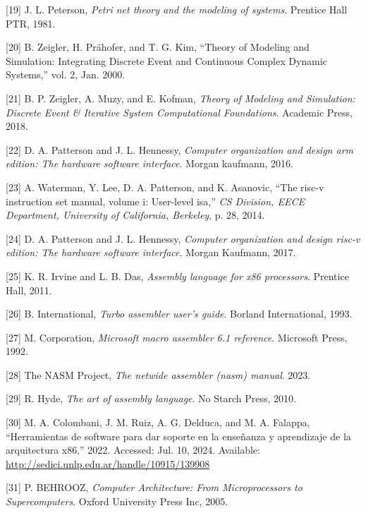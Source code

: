 \documentclass[12pt,twoside]{templates/unerthesis}
\newenvironment{cslreferences}%
  {}%
  {\par}
\begin{document}
\begin{cslreferences}
\leavevmode\hypertarget{ref-peterson_petri_1981}{}%
{[}19{]} J. L. Peterson, \emph{Petri net theory and the modeling of systems}. Prentice Hall PTR, 1981.

\leavevmode\hypertarget{ref-zeigler_theory_2000}{}%
{[}20{]} B. Zeigler, H. Prähofer, and T. G. Kim, ``Theory of Modeling and Simulation: Integrating Discrete Event and Continuous Complex Dynamic Systems,'' vol. 2, Jan. 2000.

\leavevmode\hypertarget{ref-zeigler_theory_2018}{}%
{[}21{]} B. P. Zeigler, A. Muzy, and E. Kofman, \emph{Theory of Modeling and Simulation: Discrete Event \& Iterative System Computational Foundations}. Academic Press, 2018.

\leavevmode\hypertarget{ref-patterson2016computer}{}%
{[}22{]} D. A. Patterson and J. L. Hennessy, \emph{Computer organization and design arm edition: The hardware software interface}. Morgan kaufmann, 2016.

\leavevmode\hypertarget{ref-waterman2014risc}{}%
{[}23{]} A. Waterman, Y. Lee, D. A. Patterson, and K. Asanovic, ``The risc-v instruction set manual, volume i: User-level isa,'' \emph{CS Division, EECE Department, University of California, Berkeley}, p. 28, 2014.

\leavevmode\hypertarget{ref-patterson_computer_2017}{}%
{[}24{]} D. A. Patterson and J. L. Hennessy, \emph{Computer organization and design risc-v edition: The hardware software interface}. Morgan Kaufmann, 2017.

\leavevmode\hypertarget{ref-irvine2011assembly}{}%
{[}25{]} K. R. Irvine and L. B. Das, \emph{Assembly language for x86 processors}. Prentice Hall, 2011.

\leavevmode\hypertarget{ref-tasm}{}%
{[}26{]} B. International, \emph{Turbo assembler user's guide}. Borland International, 1993.

\leavevmode\hypertarget{ref-masm}{}%
{[}27{]} M. Corporation, \emph{Microsoft macro assembler 6.1 reference}. Microsoft Press, 1992.

\leavevmode\hypertarget{ref-nasm}{}%
{[}28{]} The NASM Project, \emph{The netwide assembler (nasm) manual}. 2023.

\leavevmode\hypertarget{ref-hyde2010art}{}%
{[}29{]} R. Hyde, \emph{The art of assembly language}. No Starch Press, 2010.

\leavevmode\hypertarget{ref-colombani_herramientas_2022}{}%
{[}30{]} M. A. Colombani, J. M. Ruiz, A. G. Delduca, and M. A. Falappa, ``Herramientas de software para dar soporte en la enseñanza y aprendizaje de la arquitectura x86,'' 2022. Accessed: Jul. 10, 2024. Available: \url{http://sedici.unlp.edu.ar/handle/10915/139908}

\leavevmode\hypertarget{ref-behrooz_computer_2005}{}%
{[}31{]} P. BEHROOZ, \emph{Computer Architecture: From Microprocessors to Supercomputers}. Oxford University Press Inc, 2005.
\end{cslreferences}
\end{document}
